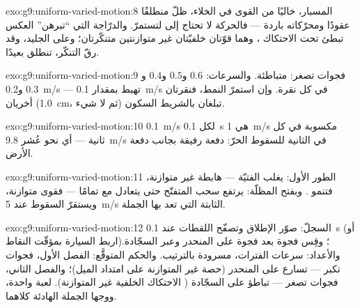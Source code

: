 \begin{solution}{exo:g9:uniform-varied-motion:8}
المسبار، خاليًا من القوى في الخلاء، ظلّ منطلقًا عقودًا
ومحرّكاته باردة --- فالحركة لا تحتاج إلى  لتستمرّ. والدرّاجة
التي ``تبرهن'' العكس تبطئ تحت الاحتكاك ، وهما قوّتان
خلفيّتان غير متوازنتين متنكّرتان؛ وعلى الجليد، وقد رقّ
التنكّر، تنطلق بعيدًا.
\end{solution}

\begin{solution}{exo:g9:uniform-varied-motion:9}
فجوات تصغر: متباطئة. والسرعات: $0.6$ و$0.5$ و$0.4$ و$0.3$
و\qty{0.2}{m/s} --- تهبط بمقدار \qty{0.1}{m/s} في كل نقرة.
وإن استمرّ النمط، فنقرتان أخريان (\qty{1.0}{cm}، ثم لا شيء)
تبلغان بالشريط السكون.
\end{solution}

\begin{solution}{exo:g9:uniform-varied-motion:10}
\qty{0.1}{m/s} لكل \qty{0.1}{s} هي \qty{1}{m/s} مكسوبة في كل
ثانية --- أي نحو عُشر \qty{9.8}{m/s} في الثانية للسقوط الحرّ:
دفعة رفيقة بجانب دفعة الأرض.
\end{solution}

\begin{solution}{exo:g9:uniform-varied-motion:11}
الطور الأول:  يغلب   الفتيّة ---  هابطة
غير متوازنة، فتنمو . وبفتح المظلّة: يرتفع سحب 
المتفتّح حتى يتعادل مع  تمامًا --- فقوى متوازنة، ويستقرّ
السقوط عند \qty{5}{m/s} الثابتة التي تعد بها الجملة.
\end{solution}

\begin{solution}{exo:g9:uniform-varied-motion:12}
السجلّ: صوّر الإطلاق وتصفّح اللقطات عند \qty{0.1}{s} (أو اربط
السيارة بمؤقّت النقاط)؛ وقِس فجوة بعد فجوة على المنحدر وعبر
السجّادة. والأعداد: سرعات الفترات، مسرودة بالترتيب. والحكم
المتوقَّع: الفصل الأول، فجوات تكبر --- تسارع على المنحدر (حصة
 غير المتوازنة على امتداد الميل)؛ والفصل الثاني، فجوات
تصغر --- تباطؤ على السجّادة ( الاحتكاك الخلفية غير
المتوازنة). لعبة واحدة، ووجها الجملة الهادئة كلاهما.
\end{solution}

